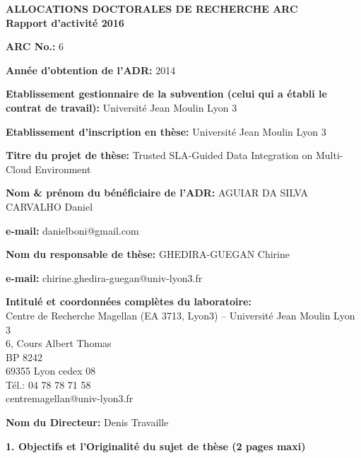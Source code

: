 \documentclass[11pt,a4paper,oneside]{report}
\author{Daniel Aguiar da Silva Carvalho}
\begin{document}
\sffamily
\begin{center}
\textbf{\large{ALLOCATIONS DOCTORALES DE RECHERCHE ARC}}\\
\textbf{\large{Rapport d’activité 2016}}
\end{center}
\bigskip

\begin{flushleft}
\textbf{ARC No.:} 6\\
\bigskip

\textbf{Année d’obtention de l’ADR:} 2014\\
\bigskip

\textbf{Etablissement gestionnaire de la subvention (celui qui a établi le contrat de travail):} Université Jean Moulin Lyon 3\\
\bigskip

\textbf{Etablissement d’inscription en thèse:} Université Jean Moulin Lyon 3\\
\bigskip

\textbf{Titre du projet de thèse:} Trusted SLA-Guided Data Integration on Multi-Cloud Environment\\
\bigskip

\textbf{Nom \& prénom du bénéficiaire de l’ADR:} AGUIAR DA SILVA CARVALHO Daniel\\
\bigskip

\textbf{e-mail:} danielboni@gmail.com\\
\bigskip

\textbf{Nom du responsable de thèse:} GHEDIRA-GUEGAN Chirine\\
\bigskip

\textbf{e-mail:} chirine.ghedira-guegan@univ-lyon3.fr\\
\bigskip

\textbf{Intitulé et coordonnées complètes du laboratoire:} \\
Centre de Recherche Magellan (EA 3713, Lyon3) – Université Jean Moulin Lyon 3\\
6, Cours Albert Thomas\\
BP 8242\\
69355 Lyon cedex 08\\
Tél.: 04 78 78 71 58\\
centremagellan@univ-lyon3.fr\\
\bigskip

\textbf{Nom du Directeur:} Denis Travaille\\
\end{flushleft}

\newpage
\begin{flushleft}
\textbf{1. Objectifs et l’Originalité du sujet de thèse (2 pages maxi)}\\
\end{flushleft} 
\end{document}
